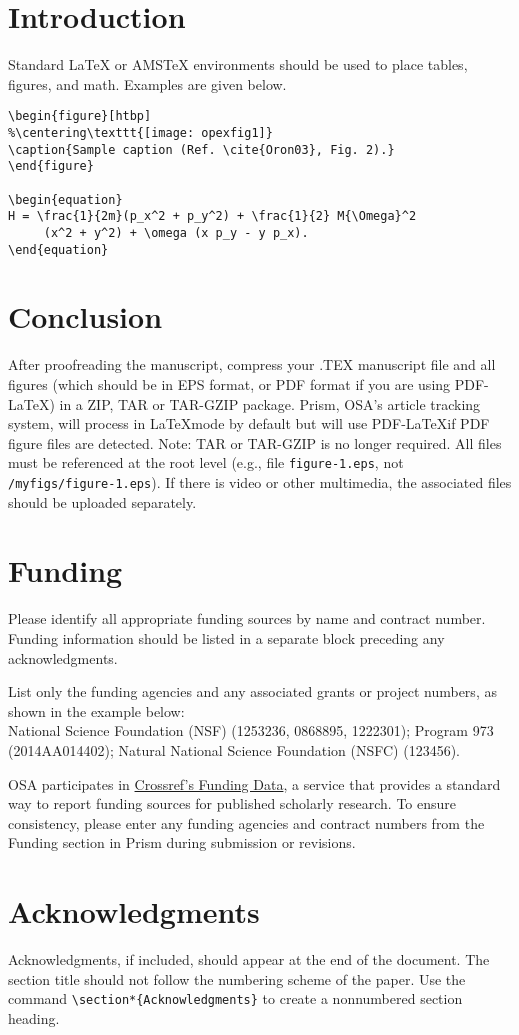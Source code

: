 \documentclass[10pt]{article}
\begin{document}
\section{Introduction}

Standard \LaTeX{} or AMS\TeX{} environments should be used to place tables, figures, and math. Examples are given below.

\begin{verbatim}
\begin{figure}[htbp]
%\centering\texttt{[image: opexfig1]}
\caption{Sample caption (Ref. \cite{Oron03}, Fig. 2).}
\end{figure}

\begin{equation}
H = \frac{1}{2m}(p_x^2 + p_y^2) + \frac{1}{2} M{\Omega}^2
     (x^2 + y^2) + \omega (x p_y - y p_x).
\end{equation}
\end{verbatim}

\section{Conclusion}
After proofreading the manuscript, compress your .TEX manuscript file and all figures (which should be in EPS format, or PDF format if you are using PDF-\LaTeX) in a ZIP, TAR or TAR-GZIP package. Prism, OSA’s article tracking system, will process in \LaTeX mode by default but will use PDF-\LaTeX if PDF figure files are detected. Note: TAR or TAR-GZIP is no longer required. All files must be referenced at the root level (e.g., file \texttt{figure-1.eps}, not \texttt{/myfigs/figure-1.eps}). If there is video or other multimedia, the associated files should be uploaded separately.

\section*{Funding}
Please identify all appropriate funding sources by name and contract number. Funding information should be listed in a separate block preceding any acknowledgments.

List only the funding agencies and any associated grants or project numbers, as shown in the example below:\\
National Science Foundation (NSF) (1253236, 0868895, 1222301); Program 973 (2014AA014402); Natural National Science Foundation (NSFC) (123456).

OSA participates in \href{http://www.crossref.org/fundingdata/}{Crossref's Funding Data}, a service that provides a standard way to report funding sources for published scholarly research. To ensure consistency, please enter any funding agencies and contract numbers from the Funding section in Prism during submission or revisions.


\section*{Acknowledgments}
Acknowledgments, if included, should appear at the end of the document. The section title should not follow the numbering scheme of the paper. Use the command \verb+\section*{Acknowledgments}+  to create a nonnumbered section heading. 
\end{document}
